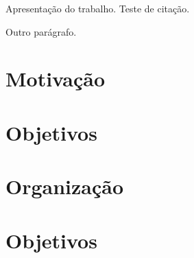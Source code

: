 
Apresentação do trabalho. Teste de citação. \cite{parrot}

Outro parágrafo. \cite{tcc-andre}

\section{Motivação}
\section{Objetivos}
\section{Organização}
\section{Objetivos}
